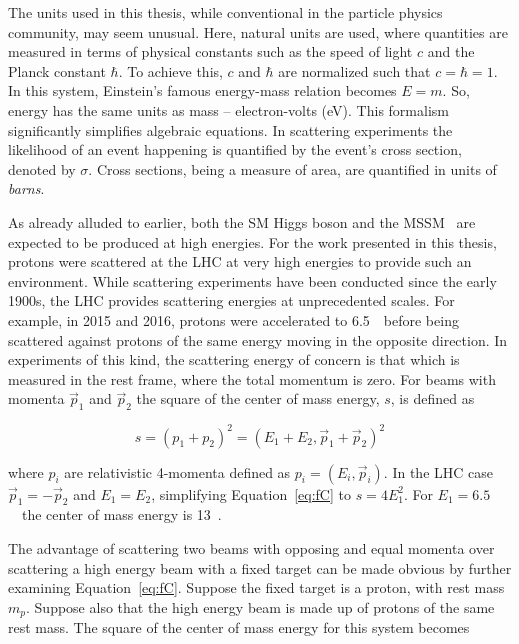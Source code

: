 \par The units used in this thesis, while conventional in the particle physics community, may seem 
unusual. Here, natural units are used, where quantities are measured in terms of physical constants 
such as the speed of light $c$ and the Planck constant $\hbar$. To achieve this, $c$ and $\hbar$ are 
normalized such that $c=\hbar=1$. In this system, Einstein's famous energy-mass relation becomes 
$E = m$. So, energy has the same units as mass -- electron-volts (eV). This formalism significantly 
simplifies algebraic equations. In scattering experiments the likelihood of an event happening is quantified by the event's 
cross section, denoted by $\sigma$. Cross sections, being a measure of area, are quantified in units 
of {\it barns}.   

\par As already alluded to earlier, both the SM Higgs boson and the MSSM \Hpm\ are expected to 
be produced at high energies. For the work presented in this thesis, protons were scattered at the LHC at very high energies to 
provide such an environment. While scattering experiments have been conducted since the early 1900s, 
the LHC provides scattering energies at unprecedented scales. For example, in 2015 and 2016, protons were accelerated to 
6.5~\TeV\ before being scattered against protons of the same energy moving in the opposite direction. 
In experiments of this kind, the scattering energy of concern is that which is measured in the rest frame, 
where the total momentum is zero. For beams with momenta $\vec{p}_1$ and $\vec{p}_2$ 
the square of the center of mass energy, $s$, is defined as

\begin{equation}
s = (p_1 + p_2)^2 = (E_1+E_2, \vec{p}_1 + \vec{p}_2)^2
\label{eq:fC}
\end{equation}  

where $p_i$ are relativistic 4-momenta defined as $p_i = (E_i,\vec{p}_i)$.  
In the LHC case $\vec{p}_1=-\vec{p}_2$ and $E_1=E_2$, simplifying Equation~\ref{eq:fC} to 
$s = 4E_1^2$. For $E_1= 6.5$~\TeV\ the center of mass energy is 13~\TeV. 

\par The advantage of scattering two beams with opposing and equal momenta over scattering 
a high energy beam with a fixed target can be made obvious by further examining Equation~\ref{eq:fC}.
Suppose the fixed target is a proton, with rest mass $m_p$. Suppose also that the high energy beam 
is made up of protons of the same rest mass. The square of the center of mass energy 
for this system becomes 

